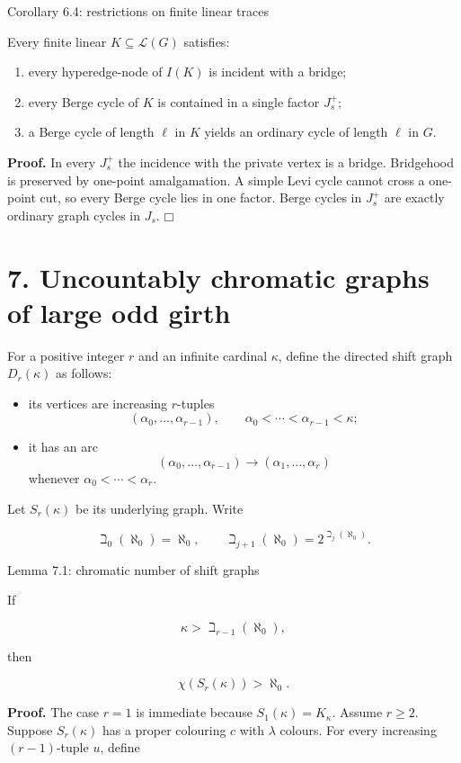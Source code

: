\documentclass[11pt]{article}
\newcommand{\tightlist}{\setlength{\itemsep}{0pt}\setlength{\parskip}{0pt}}
\providecommand{\square}{\mdlgwhtsquare}
\begin{document}
\label{corollary-6.4-restrictions-on-finite-linear-traces}
\begin{corollarybox}{Corollary 6.4: restrictions on finite linear traces}

Every finite linear \(K\subseteq\mathcal L(G)\) satisfies:

\begin{enumerate}
\def\labelenumi{\arabic{enumi}.}
\tightlist
\item
  every hyperedge-node of \(I(K)\) is incident with a bridge;
\item
  every Berge cycle of \(K\) is contained in a single factor \(J_s^+\);
\item
  a Berge cycle of length \(\ell\) in \(K\) yields an ordinary cycle of length \(\ell\) in \(G\).
\end{enumerate}

\end{corollarybox}
\textbf{Proof.} In every \(J_s^+\) the incidence with the private vertex is a bridge. Bridgehood is preserved by one-point amalgamation. A simple Levi cycle cannot cross a one-point cut, so every Berge cycle lies in one factor. Berge cycles in \(J_s^+\) are exactly ordinary graph cycles in \(J_s\). \(\square\)

\section{7. Uncountably chromatic graphs of large odd girth}\label{uncountably-chromatic-graphs-of-large-odd-girth}

For a positive integer \(r\) and an infinite cardinal \(\kappa\), define the directed shift graph \(D_r(\kappa)\) as follows:

\begin{itemize}
\tightlist
\item
  its vertices are increasing \(r\)-tuples \[(\alpha_0,\ldots,\alpha_{r-1}),\qquad
    \alpha_0<\cdots<\alpha_{r-1}<\kappa;\]
\item
  it has an arc \[(\alpha_0,\ldots,\alpha_{r-1})
    \longrightarrow
    (\alpha_1,\ldots,\alpha_r)\] whenever \(\alpha_0<\cdots<\alpha_r\).
\end{itemize}

Let \(S_r(\kappa)\) be its underlying graph. Write

\[
\beth_0(\aleph_0)=\aleph_0,
\qquad
\beth_{j+1}(\aleph_0)=2^{\beth_j(\aleph_0)}.
\]

\label{lemma-7.1-chromatic-number-of-shift-graphs}
\begin{lemmabox}{Lemma 7.1: chromatic number of shift graphs}

If

\[
\kappa>\beth_{r-1}(\aleph_0),
\]

then

\[
\chi(S_r(\kappa))>\aleph_0.
\]

\end{lemmabox}
\textbf{Proof.} The case \(r=1\) is immediate because \(S_1(\kappa)=K_\kappa\). Assume \(r\ge2\). Suppose \(S_r(\kappa)\) has a proper colouring \(c\) with \(\lambda\) colours. For every increasing \((r-1)\)-tuple \(u\), define
\end{document}
